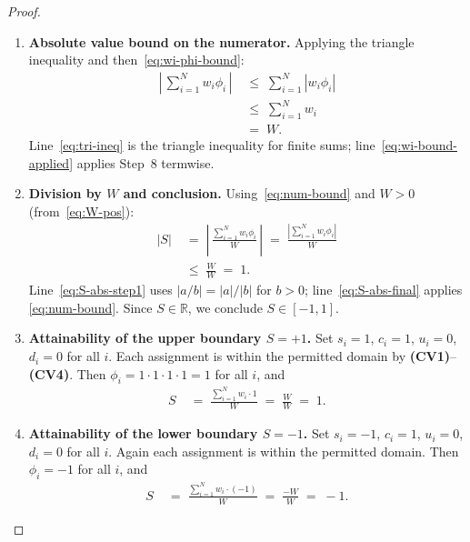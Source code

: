 \documentclass[12pt,openany]{book}
\numberwithin{equation}{chapter}
\theoremstyle{plain}
\theoremstyle{definition}
\theoremstyle{remark}
\numberwithin{equation}{chapter}
\theoremstyle{plain}
\begin{document}
\begin{proof}
\begin{enumerate}
  \item \textbf{Absolute value bound on the numerator.}
        Applying the triangle inequality and then~\eqref{eq:wi-phi-bound}:
        \begin{align}
          \left|\,\sum_{i=1}^{N} w_i \phi_i\,\right|
          &\;\leq\; \sum_{i=1}^{N} \left|w_i \phi_i\right|
          \label{eq:tri-ineq}\\
          &\;\leq\; \sum_{i=1}^{N} w_i
          \label{eq:wi-bound-applied}\\
          &\;=\; W.
          \label{eq:num-bound}
        \end{align}
        Line~\eqref{eq:tri-ineq} is the triangle inequality for
        finite sums; line~\eqref{eq:wi-bound-applied} applies
        Step~8 termwise.

  \item \textbf{Division by $W$ and conclusion.}
        Using~\eqref{eq:num-bound} and $W > 0$
        (from~\eqref{eq:W-pos}):
        \begin{align}
          |S|
          &\;=\;
          \left|\,
            \frac{\displaystyle\sum_{i=1}^{N} w_i \phi_i}{W}
          \,\right|
          \;=\;
          \frac{\left|\displaystyle\sum_{i=1}^{N} w_i \phi_i\right|}{W}
          \label{eq:S-abs-step1}\\[4pt]
          &\;\leq\;
          \frac{W}{W}
          \;=\; 1.
          \label{eq:S-abs-final}
        \end{align}
        Line~\eqref{eq:S-abs-step1} uses $|a/b| = |a|/|b|$ for
        $b > 0$; line~\eqref{eq:S-abs-final} applies
        \eqref{eq:num-bound}.
        Since $S \in \mathbb{R}$, we conclude $S \in [-1,1]$.

  \item \textbf{Attainability of the upper boundary $S = +1$.}
        Set $s_i = 1$, $c_i = 1$, $u_i = 0$, $d_i = 0$ for
        all $i$.  Each assignment is within the permitted domain
        by \textbf{(CV1)}--\textbf{(CV4)}.  Then
        $\phi_i = 1 \cdot 1 \cdot 1 \cdot 1 = 1$ for all $i$, and
        \begin{align}
          S
          &\;=\;
          \frac{\displaystyle\sum_{i=1}^{N} w_i \cdot 1}{W}
          \;=\;
          \frac{W}{W}
          \;=\; 1.
          \label{eq:S-upper-attain}
        \end{align}

  \item \textbf{Attainability of the lower boundary $S = -1$.}
        Set $s_i = -1$, $c_i = 1$, $u_i = 0$, $d_i = 0$ for
        all $i$.  Again each assignment is within the permitted
        domain.  Then $\phi_i = -1$ for all $i$, and
        \begin{align}
          S
          &\;=\;
          \frac{\displaystyle\sum_{i=1}^{N} w_i \cdot (-1)}{W}
          \;=\;
          \frac{-W}{W}
          \;=\; -1.
          \label{eq:S-lower-attain}
        \end{align}


\end{enumerate}
\end{proof}
\end{document}
